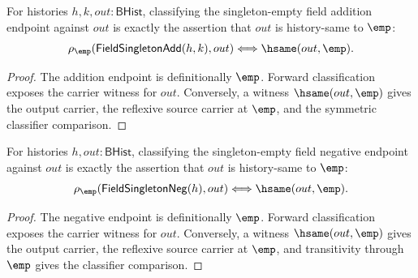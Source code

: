 \begin{theorem}
\label{thm:field-singleton-add-endpoint-classifier}
For histories $h,k,out:\mathsf{BHist}$, classifying the singleton-empty field
addition endpoint against $out$ is exactly the assertion that $out$ is
history-same to $\emp$:
$$
\rho_{\emp}(\mathsf{FieldSingletonAdd}(h,k),out)
\Longleftrightarrow
\hsame(out,\emp).
$$
\end{theorem}
\begin{proof}
The addition endpoint is definitionally $\emp$. Forward classification exposes
the carrier witness for $out$. Conversely, a witness $\hsame(out,\emp)$ gives
the output carrier, the reflexive source carrier at $\emp$, and the symmetric
classifier comparison.
\end{proof}

\begin{theorem}
\label{thm:field-singleton-neg-endpoint-classifier-iff}
For histories $h,out:\mathsf{BHist}$, classifying the singleton-empty field
negative endpoint against $out$ is exactly the assertion that $out$ is
history-same to $\emp$:
$$
\rho_{\emp}(\mathsf{FieldSingletonNeg}(h),out)
\Longleftrightarrow
\hsame(out,\emp).
$$
\end{theorem}
\begin{proof}
The negative endpoint is definitionally $\emp$. Forward classification exposes
the carrier witness for $out$. Conversely, a witness $\hsame(out,\emp)$ gives
the output carrier, the reflexive source carrier at $\emp$, and transitivity
through $\emp$ gives the classifier comparison.
\end{proof}

